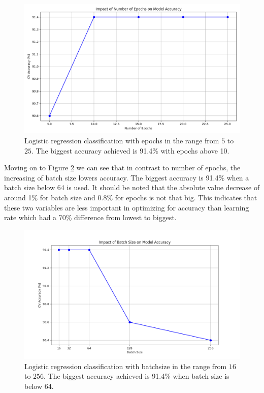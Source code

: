 \begin{figure}[H]
    \centering
    \includegraphics[width=\textwidth]{results/logreg/number_of_epochs_study.png}
    \caption{Logistic regression classification with epochs in the range from $5$ to $25$. The biggest accuracy achieved is 91.4\% with epochs above 10.}
    \label{fig:LogRegEpochs}
\end{figure}

\newpage
Moving on to Figure \ref{fig:LogRegBatchsize} we can see that in contrast to number of epochs, the increasing of batch size lowers accuracy. The biggest accuracy is 91.4\% when a batch size below 64 is used. It should be noted that the absolute value decrease of around 1\% for batch size and 0.8\% for epochs is not that big. This indicates that these two variables are less important in optimizing for accuracy than learning rate which had a 70\% difference from lowest to biggest. 

\begin{figure}[H]
    \centering
    \includegraphics[width=\textwidth]{results/logreg/batch_size_study.png}
    \caption{Logistic regression classification with batchsize in the range from $16$ to $256$. The biggest accuracy achieved is 91.4\% when batch size is below 64.}
    \label{fig:LogRegBatchsize}
\end{figure}

